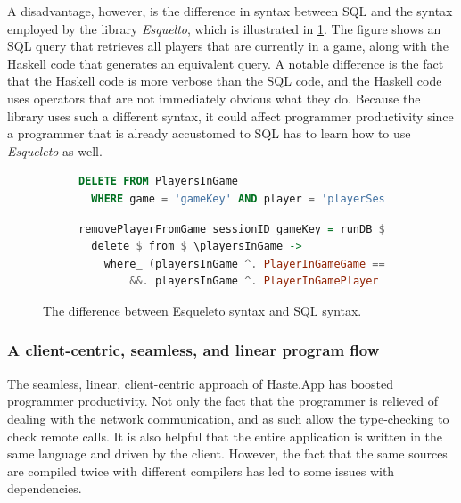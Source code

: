 \documentclass[a4paper]{article}
\begin{document}
A disadvantage, however, is the difference in syntax between SQL and the syntax employed by the library \textit{Esquelto}, which is illustrated in \cref{fig:esqueleto-vs-sql}. The figure shows an SQL query that retrieves all players that are currently in a game, along with the Haskell code that generates an equivalent query. A notable difference is the fact that the Haskell code is more verbose than the SQL code, and the Haskell code uses operators that are not immediately obvious what they do. Because the library uses such a different syntax, it could affect programmer productivity since a programmer that is already accustomed to SQL has to learn how to use \textit{Esqueleto} as well.



\begin{figure}[ht!]
\begin{subfigure}[]{\textwidth}
\begin{lstlisting}[language=SQL]
DELETE FROM PlayersInGame
  WHERE game = 'gameKey' AND player = 'playerSessionId';
\end{lstlisting}
\end{subfigure}

\begin{subfigure}[]{\textwidth}
\begin{lstlisting}[language=Haskell]
removePlayerFromGame sessionID gameKey = runDB $
  delete $ from $ \playersInGame ->
    where_ (playersInGame ^. PlayerInGameGame ==. val gameKey
        &&. playersInGame ^. PlayerInGamePlayer ==. val sessionID)
\end{lstlisting}
\end{subfigure}

\caption{The difference between Esqueleto syntax and SQL syntax.}
\label{fig:esqueleto-vs-sql}
\end{figure}


\subsubsection{A client-centric, seamless, and linear program flow}
The seamless, linear, client-centric approach of Haste.App has boosted programmer productivity. Not only the fact that the programmer is relieved of dealing with the network communication, and as such allow the type-checking to check remote calls. It is also helpful that the entire application is written in the same language and driven by the client. However, the fact that the same sources are compiled twice with different compilers has led to some issues with dependencies.
\end{document}
